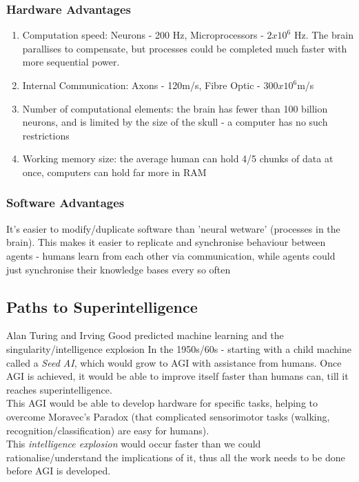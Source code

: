 \subsubsection{Hardware Advantages}
\begin{enumerate}
    \item Computation speed: Neurons - 200 Hz, Microprocessors - $2x10^6$ Hz. The brain parallises to compensate, but processes could be completed much faster with more sequential power.
    \item Internal Communication: Axons - 120m/s, Fibre Optic - $300x10^6$m/s
    \item Number of computational elements: the brain has fewer than 100 billion neurons, and is limited by the size of the skull - a computer has no such restrictions
    \item Working memory size: the average human can hold 4/5 chunks of data at once, computers can hold far more in RAM
\end{enumerate}

\subsubsection{Software Advantages}
It's easier to modify/duplicate software than 'neural wetware' (processes in the brain). This makes it easier to replicate and synchronise behaviour between agents - humans learn from each other via communication, while agents could just synchronise their knowledge bases every so often

\subsection{Paths to Superintelligence}
Alan Turing and Irving Good predicted machine learning and the singularity/intelligence explosion In the 1950s/60s - starting with a child machine called a \emph{Seed AI}, which would grow to AGI with assistance from humans. Once AGI is achieved, it would be able to improve itself faster than humans can, till it reaches superintelligence. \\

This AGI would be able to develop hardware for specific tasks, helping to overcome Moravec's Paradox (that complicated sensorimotor tasks (walking, recognition/classification) are easy for humans). \\

This \emph{intelligence explosion} would occur faster than we could rationalise/understand the implications of it, thus all the work needs to be done before AGI is developed.\\

